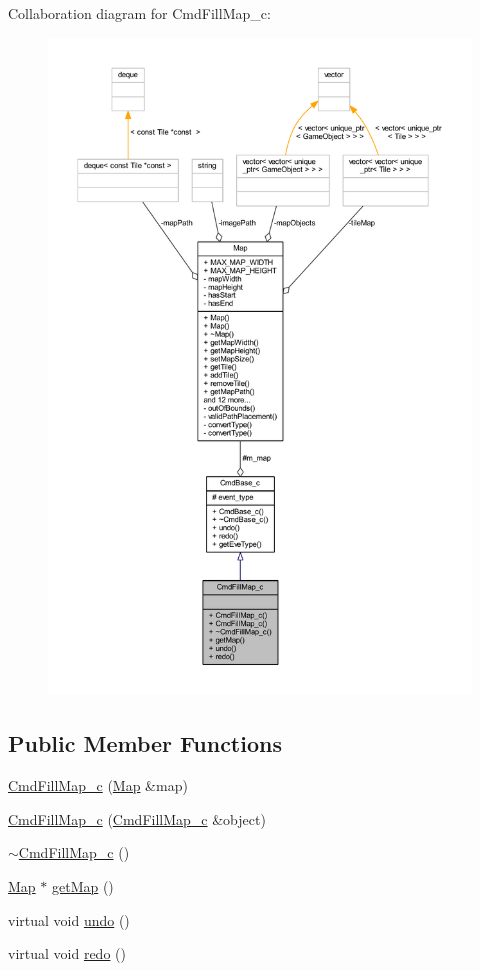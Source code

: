Collaboration diagram for Cmd\+Fill\+Map\+\_\+c\+:\nopagebreak
\begin{figure}[H]
\begin{center}
\leavevmode
\includegraphics[width=350pt]{class_cmd_fill_map__c__coll__graph}
\end{center}
\end{figure}
\subsection*{Public Member Functions}
\begin{DoxyCompactItemize}
\item 
\hyperlink{class_cmd_fill_map__c_af550a837d8dfeaa132f0142989601417}{Cmd\+Fill\+Map\+\_\+c} (\hyperlink{class_map}{Map} \&map)
\item 
\hyperlink{class_cmd_fill_map__c_ad23584b826ccbcf93b19a0b50e0b3d62}{Cmd\+Fill\+Map\+\_\+c} (\hyperlink{class_cmd_fill_map__c}{Cmd\+Fill\+Map\+\_\+c} \&object)
\item 
\hyperlink{class_cmd_fill_map__c_ae47760580663dd9da93f38a357452bc9}{$\sim$\+Cmd\+Fill\+Map\+\_\+c} ()
\item 
\hyperlink{class_map}{Map} $\ast$ \hyperlink{class_cmd_fill_map__c_a6b6db21bb875d71bb5c28f3b7ea9a76f}{get\+Map} ()
\item 
virtual void \hyperlink{class_cmd_fill_map__c_a1fc1349fea407dbc4a41f614eec45fbf}{undo} ()
\item 
virtual void \hyperlink{class_cmd_fill_map__c_a03c8b3d6027ae4bf50714b6358125eab}{redo} ()
\end{DoxyCompactItemize}
